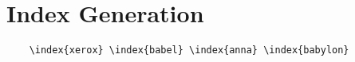 \chapter{Index Generation}


   

\begin{verbatim}
	\index{xerox} \index{babel} \index{anna} \index{babylon}
\end{verbatim}